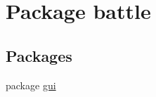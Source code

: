 \hypertarget{namespacebattle}{}\section{Package battle}
\label{namespacebattle}
\subsection*{Packages}
\begin{DoxyCompactItemize}
\item 
package \hyperlink{namespacebattle_1_1gui}{gui}
\end{DoxyCompactItemize}
